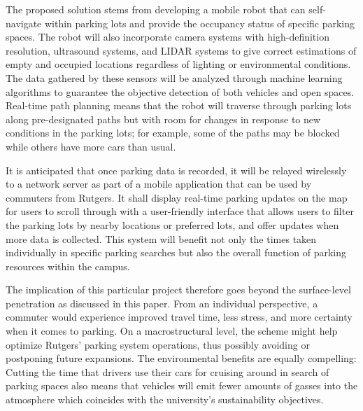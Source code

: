 \documentclass{article}
\begin{document}
\begin{enumerate}[leftmargin=1.5cm]
    The proposed solution stems from developing a mobile robot that can self-navigate within parking lots and provide the occupancy status of specific parking spaces. 
    The robot will also incorporate camera systems with high-definition resolution, 
    ultrasound systems, 
    and LIDAR systems to give correct estimations of empty and occupied locations regardless of lighting or environmental conditions. 
    The data gathered by these sensors will be analyzed through machine learning algorithms to guarantee the objective detection of both vehicles and open spaces. 
    Real-time path planning means that the robot will traverse through parking lots along pre-designated 
    paths but with room for changes in response to new conditions in the parking lots; 
    for example, some of the paths may be blocked while others have more cars than usual.

    It is anticipated that once parking data is recorded, 
    it will be relayed wirelessly to a network server as part of a mobile application that can be used by commuters from Rutgers. 
    It shall display real-time parking updates on the map for users to scroll through with a user-friendly
    interface that allows users to filter the parking lots by nearby locations or preferred lots, 
    and offer updates when more data is collected. 
    This system will benefit not only the times taken individually in specific parking searches but also the overall function of parking resources within the campus.

    The implication of this particular project therefore goes beyond the surface-level penetration as discussed in this paper. 
    From an individual perspective, 
    a commuter would experience improved travel time, 
    less stress, 
    and more certainty when it comes to parking. 
    On a macrostructural level, 
    the scheme might help optimize Rutgers’ parking system operations, 
    thus possibly avoiding or postponing future expansions. 
    The environmental benefits are equally compelling: 
    Cutting the time that drivers use their cars for cruising around in search of parking spaces also means that vehicles will emit fewer amounts
    of gasses into the atmosphere which coincides with the university’s sustainability objectives.


\end{enumerate}
\end{document}
